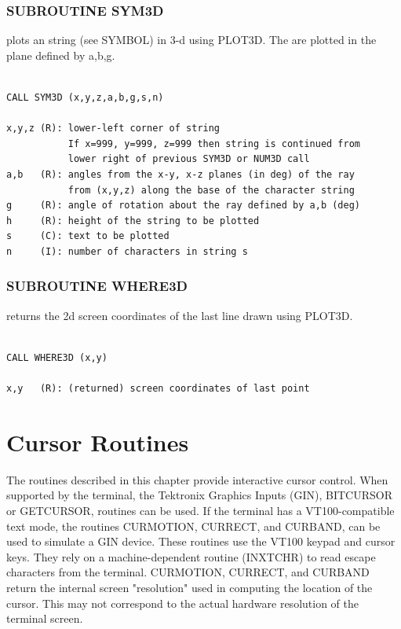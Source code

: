 \documentclass[11pt]{report}
\begin{document}
\subsection{SUBROUTINE SYM3D}

 plots an  string (see SYMBOL) in 3-d using
PLOT3D.  The  are plotted in the plane defined by a,b,g.
\begin{verbatim}

CALL SYM3D (x,y,z,a,b,g,s,n)

x,y,z (R): lower-left corner of string
           If x=999, y=999, z=999 then string is continued from
           lower right of previous SYM3D or NUM3D call
a,b   (R): angles from the x-y, x-z planes (in deg) of the ray
           from (x,y,z) along the base of the character string
g     (R): angle of rotation about the ray defined by a,b (deg)
h     (R): height of the string to be plotted
s     (C): text to be plotted
n     (I): number of characters in string s
\end{verbatim}

\subsection{SUBROUTINE WHERE3D}

 returns the 2d screen coordinates of the last line drawn using
PLOT3D.
\begin{verbatim}

CALL WHERE3D (x,y)

x,y   (R): (returned) screen coordinates of last point
\end{verbatim}

\chapter{Cursor Routines}

The routines described in this chapter provide interactive cursor control.
When supported by the terminal, the Tektronix Graphics Inputs (GIN), 
BITCURSOR or GETCURSOR, routines can be used.  If the terminal has
a VT100-compatible text mode, the routines CURMOTION, CURRECT, and CURBAND,
can be used to simulate a GIN device.  These routines use the VT100
keypad and cursor keys.  They rely on a machine-dependent routine
(INXTCHR) to read escape characters from the terminal.  CURMOTION,
CURRECT, and CURBAND return the internal screen "resolution" used
in computing the location of the cursor.  This may not correspond to the
actual hardware resolution of the terminal screen.
\end{document}

